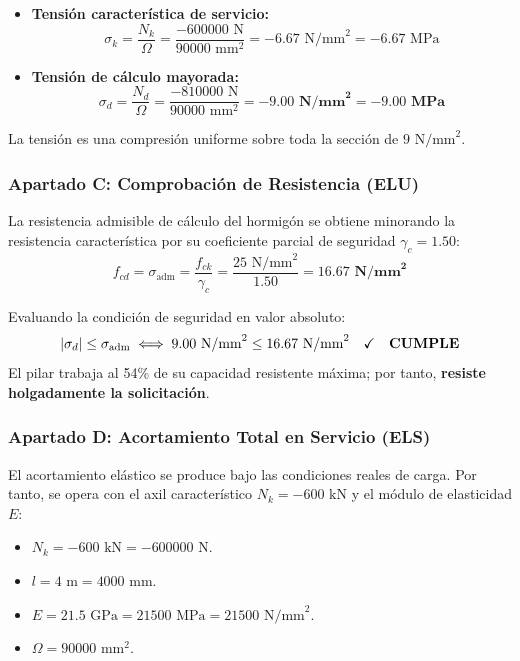 \begin{itemize}
    \item \textbf{Tensión característica de servicio:}
          \begin{equation}
              \sigma_k = \frac{N_k}{\Omega} = \frac{-600000\text{ N}}{90000\text{ mm}^2} = -6.67\text{ N/mm}^2 = -6.67\text{ MPa}
          \end{equation}
    \item \textbf{Tensión de cálculo mayorada:}
          \begin{equation}
              \sigma_d = \frac{N_d}{\Omega} = \frac{-810000\text{ N}}{90000\text{ mm}^2} = \mathbf{-9.00\text{ N/mm}^2 = -9.00\text{ MPa}}
          \end{equation}
\end{itemize}
La tensión es una compresión uniforme sobre toda la sección de $9\text{ N/mm}^2$.

\subsubsection*{Apartado C: Comprobación de Resistencia (ELU)}
La resistencia admisible de cálculo del hormigón se obtiene minorando la resistencia característica por su coeficiente parcial de seguridad $\gamma_c = 1.50$:
\begin{equation}
    f_{cd} = \sigma_{\text{adm}} = \frac{f_{ck}}{\gamma_c} = \frac{25\text{ N/mm}^2}{1.50} = \mathbf{16.67\text{ N/mm}^2}
\end{equation}

Evaluando la condición de seguridad en valor absoluto:
\begin{equation}
    |\sigma_d| \le \sigma_{\text{adm}} \iff 9.00\text{ N/mm}^2 \le 16.67\text{ N/mm}^2 \quad \boldsymbol{\checkmark \quad \text{\textbf{CUMPLE}}}
\end{equation}
El pilar trabaja al 54\% de su capacidad resistente máxima; por tanto, \textbf{resiste holgadamente la solicitación}.

\subsubsection*{Apartado D: Acortamiento Total en Servicio (ELS)}
\begin{ImportanteBox}[title={Cálculo de Deformaciones: ¡Sin Mayorar!}]
    El acortamiento elástico se produce bajo las condiciones reales de carga. Por tanto, se opera con el axil característico $N_k = -600\text{ kN}$ y el módulo de elasticidad $E$:
    \begin{itemize}
        \item $N_k = -600\text{ kN} = -600000\text{ N}$.
        \item $l = 4\text{ m} = 4000\text{ mm}$.
        \item $E = 21.5\text{ GPa} = 21500\text{ MPa} = 21500\text{ N/mm}^2$.
        \item $\Omega = 90000\text{ mm}^2$.
    \end{itemize}
\end{ImportanteBox}

